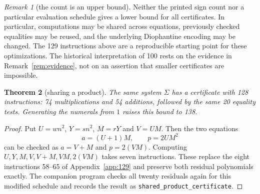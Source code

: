 \documentclass[11pt,letterpaper]{article}
\newtheorem{theorem}{Theorem}[section]
\theoremstyle{definition}
\theoremstyle{remark}
\newtheorem{remark}[theorem]{Remark}
\numberwithin{equation}{section}
\begin{document}
\begin{remark}[the count is an upper bound]
\label{rem:whynot}
Neither the printed sign count nor a particular evaluation schedule gives
a lower bound for all certificates. In particular, computations may be
shared across equations, previously checked equalities may be reused, and
the underlying Diophantine encoding may be changed. The 129 instructions
above are a reproducible starting point for these optimizations. The
historical interpretation of 100 rests on the evidence in
Remark~\ref{rem:evidence}, not on an assertion that smaller certificates
are impossible.
\end{remark}

\begin{theorem}[sharing a product]\label{thm:128}
The same system $\Sigma$ has a certificate with 128 instructions:
74 multiplications and 54 additions, followed by the same 20 equality
tests. Generating the numerals from $1$ raises this bound to 138.
\end{theorem}

\begin{proof}
Put $U=wn^2$, $Y=sn^2$, $M=rY$ and $V=UM$. Then the two equations
\[
 a=(U+1)M,\qquad p=2UM^2
\]
can be checked as $a=V+M$ and $p=2(VM)$. Computing $U,Y,M,V,V+M,VM,2(VM)$
takes seven instructions. These replace the eight instructions 58--65
of Appendix~\ref{app:129} and preserve both residual polynomials exactly. The
companion program checks all twenty residuals again for this modified
schedule and records the result as \texttt{shared\_product\_certificate}.
\end{proof}































\end{document}

